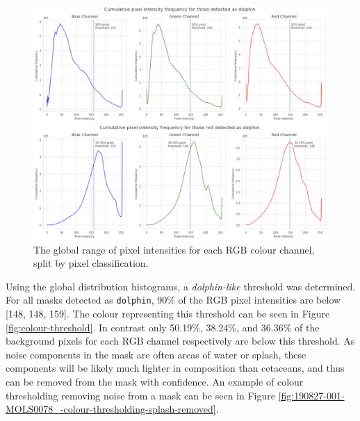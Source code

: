 \begin{figure}
	\begin{center}
		\includegraphics[scale=0.7]{Chapter3/figs/histogram.png}
	\end{center}
	\caption{The global range of pixel intensities for each RGB colour channel, split by pixel classification.}\label{fig:global-histogram}
\end{figure}

Using the global distribution histograms, a \textit{dolphin-like} threshold was determined. For all masks detected as \texttt{dolphin}, 90\% of the RGB pixel intensities are below [148, 148, 159]. The colour representing this threshold can be seen in Figure \ref{fig:colour-threshold}. In contrast only 50.19\%, 38.24\%, and 36.36\% of the background pixels for each RGB channel respectively are below this threshold. As noise components in the mask are often areas of water or splash, these components will be likely much lighter in composition than cetaceans, and thus can be removed from the mask with confidence. An example of colour thresholding removing noise from a mask can be seen in Figure \ref{fig:190827-001-MOLS0078_-colour-thresholding-splash-removed}.

